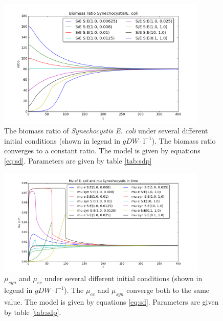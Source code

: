 \documentclass[10pt]{report}
\begin{document}
\begin{figure}[!ht]
 \begin{center}  
     \includegraphics[width=10cm]{ratios_interdependent_2.png}
     \caption{The biomass ratio of \textit{Synechocystis} \textit{E. coli} under several different initial conditions (shown in legend in $gDW\cdot \text{l}^{-1}$). The biomass ratio converges to a constant ratio. The model is given by equations \ref{eq:sd}. Parameters are given by table \ref{tab:sdp}}
    \label{fig:subrat2}
    \end{center}
\end{figure}


\begin{figure}[!ht]
 \begin{center}  
     \includegraphics[width=10cm]{ratios_interdependence_mus.png}
     \caption{$\mu_{syn}$ and $\mu_{ec}$ under several different initial conditions (shown in legend in $gDW\cdot \text{l}^{-1}$). The $\mu_{ec}$ and $\mu_{syn}$ converge both to the same value. The model is given by equations \ref{eq:sd}. Parameters are given by table \ref{tab:sdp}.}
    \label{fig:submu}
    \end{center}
\end{figure}
\end{document}
